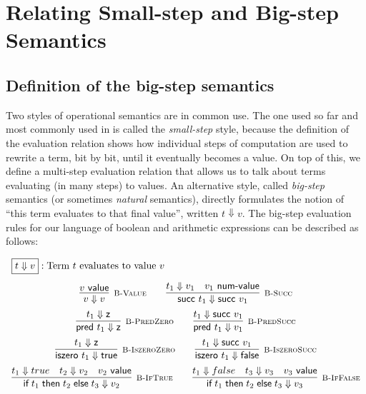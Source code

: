 
\section{Relating Small-step and Big-step Semantics}

\subsection{Definition of the big-step semantics}

Two styles of operational semantics are in common use. The one used so far and
most commonly used in \cite{TAPL} is called the {\em small-step} style, because the definition of the
evaluation relation shows how individual steps of computation are used to
rewrite a term, bit by bit, until it eventually becomes a value. On top of this,
we define a multi-step evaluation relation that allows us to talk about terms
evaluating (in many steps) to values. An alternative style, called
{\em big-step} semantics (or sometimes {\em natural} semantics), directly
formulates the notion of ``this term evaluates to that final value'', written
$t \Downarrow v$. The big-step evaluation rules for our language of boolean and
arithmetic expressions can be described as follows:

\[
\begin{array}{c}
\multicolumn{1}{l}{\fbox{$t \Downarrow v$}: \mbox{Term $t$ evaluates to value $v$}}\\[1em]
  \infer[\BValue]{v \Downarrow v}{v \Value} \qquad
  \infer[\BSucc]{\tmsucc t_1 \Downarrow \tmsucc v_1}{t_1 \Downarrow v_1 & v_1 \NumValue} \\[0.5em]
  \infer[\BPredZero]{\tmpred t_1 \Downarrow \tmzero}{t_1 \Downarrow \tmzero} \qquad
  \infer[\BPredSucc]{\tmpred t_1 \Downarrow v_1}{t_1 \Downarrow \tmsucc v_1}
\\[0.5em]
  \infer[\BIszeroZero]{\tmiszero t_1 \Downarrow \tmtrue}{t_1 \Downarrow \tmzero} \qquad
  \infer[\BIszeroSucc]{\tmiszero t_1 \Downarrow \tmfalse}{t_1 \Downarrow \tmsucc v_1} 
\\[0.5em]
  \infer[\BIfTrue]{\tmif {t_1}{t_2}{t_3} \Downarrow v_2}{t_1 \Downarrow true & t_2 \Downarrow v_2 & v_2 \Value} \qquad
  \infer[\BIfFalse]{\tmif {t_1}{t_2}{t_3} \Downarrow v_3}{t_1 \Downarrow false & t_3 \Downarrow v_3 & v_3 \Value} \\

\end{array}
\]


